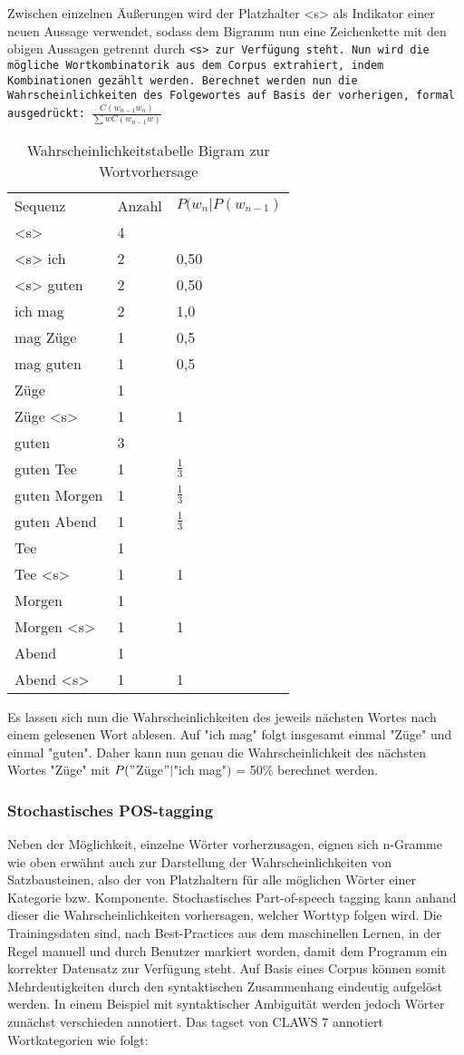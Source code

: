 \documentclass[12pt]{paper}
\begin{document}
Zwischen einzelnen Äußerungen wird der Platzhalter <s> als Indikator einer neuen Aussage verwendet, sodass dem Bigramm nun eine Zeichenkette mit den obigen Aussagen getrennt durch \tt <s> \rm zur Verfügung steht. Nun wird die mögliche Wortkombinatorik aus dem Corpus extrahiert, indem Kombinationen gezählt werden. Berechnet werden nun die Wahrscheinlichkeiten des Folgewortes auf Basis der vorherigen, formal ausgedrückt: $\frac{C(w_{n-1} w_{n})}{\sum{w}{}C(w_{n-1}w)}$
\tt
\begin{table}[h]
\begin{tabular}{lll}
Sequenz & Anzahl & $P(w_{n}|P(w_{n-1})$ \\
<s> & 4 & \\
<s> ich & 2 & 0,50 \\
<s> guten & 2 & 0,50 \\ 
ich mag & 2 & 1,0 \\ 
mag Züge & 1 & 0,5 \\
mag guten & 1 & 0,5 \\
Züge & 1 & \\
Züge <s> & 1 & 1 \\
guten & 3 & \\
guten Tee & 1 & $\frac{1}{3}$ \\
guten Morgen & 1 & $\frac{1}{3}$ \\
guten Abend & 1 & $\frac{1}{3}$ \\
Tee & 1 & \\
Tee <s> & 1 & 1 \\
Morgen & 1 & \\
Morgen <s> & 1 & 1 \\
Abend & 1 & \\
Abend <s> & 1 & 1\\
\end{tabular}
\caption{Wahrscheinlichkeitstabelle Bigram zur Wortvorhersage}
\end{table}
\rm
Es lassen sich nun die Wahrscheinlichkeiten des jeweils nächsten Wortes nach einem gelesenen Wort ablesen. Auf "ich mag" folgt insgesamt einmal "Züge" und einmal "guten". Daher kann nun genau die Wahrscheinlichkeit des nächsten Wortes "Züge" mit $P("$Züge$"|$"ich mag"$)$ = 50\% berechnet werden.

\subsubsection{Stochastisches POS-tagging}
Neben der Möglichkeit, einzelne Wörter vorherzusagen, eignen sich n-Gramme wie oben erwähnt auch zur Darstellung der Wahrscheinlichkeiten von Satzbausteinen, also der von Platzhaltern für alle möglichen Wörter einer Kategorie bzw. Komponente. Stochastisches Part-of-speech tagging kann anhand dieser die Wahrscheinlichkeiten vorhersagen, welcher Worttyp folgen wird. Die Trainingsdaten sind, nach Best-Practices aus dem maschinellen Lernen, in der Regel manuell und durch Benutzer markiert worden, damit dem Programm ein korrekter Datensatz zur Verfügung steht. Auf Basis eines Corpus können somit Mehrdeutigkeiten durch den syntaktischen Zusammenhang eindeutig aufgelöst werden. In einem Beispiel mit syntaktischer Ambiguität werden jedoch Wörter zunächst verschieden annotiert.
Das tagset von CLAWS 7 annotiert Wortkategorien wie folgt:
\end{document}
